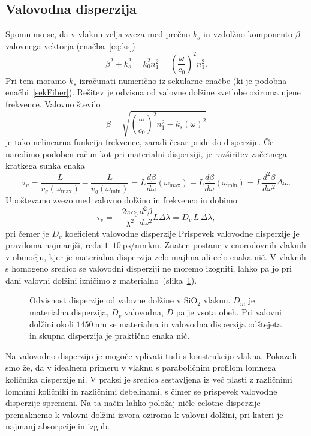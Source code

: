 \subsection*{Valovodna disperzija}
Spomnimo se, da v vlaknu velja zveza med prečno $k_s$ in vzdolžno komponento $\beta$ 
valovnega vektorja (enačba~\ref{eq:ks})
\begin{equation}
\beta^2 + k_s^2 = k_0^2 n_1^2 = \left( \frac{\omega}{c_0}\right)^2n_1^2.
\end{equation}
Pri tem moramo $k_s$ izračunati numerično iz sekularne enačbe (ki je podobna enačbi~\ref{sekFiber}). 
Rešitev je odvisna od valovne dolžine svetlobe oziroma njene frekvence. Valovno število  
\begin{equation}
\beta = \sqrt{\left( \frac{\omega}{c_0}\right)^2n_1^2 - k_s(\omega)^2}
\end{equation}
je tako nelinearna funkcija frekvence, zaradi česar pride do disperzije. Če naredimo podoben 
račun kot pri materialni disperziji, je razširitev začetnega kratkega sunka enaka
\begin{equation}
\tau_v = \frac{L}{v_g(\omega_{\mathrm{max}})} - \frac{L}{v_g(\omega_{\mathrm{min}})} = 
L\frac{d \beta}{d\omega}(\omega_{\mathrm{max}}) - L\frac{d \beta}{d\omega}(\omega_{\mathrm{min}})=
L \frac{d^2\beta}{d\omega^2}\Delta \omega.
\label{ValD}
\end{equation}
Upoštevamo zvezo med valovno dolžino in frekvenco in dobimo 
\begin{equation}
\tau_v=-\frac{2 \pi c_0}{\lambda^2}\frac{d^2\beta}{d\omega^2}L \Delta \lambda= D_v\,L\, \Delta \lambda,
\end{equation}
pri čemer je  $D_v$ koeficient valovodne disperzije
Prispevek valovodne disperzije je praviloma najmanjši, reda 
$1$--$10~\si{\pico\second/\nano\meter\,\kilo\meter}$. 
Znaten postane v enorodovnih vlaknih v območju, kjer je materialna disperzija 
zelo majhna ali celo enaka nič. 
V vlaknih s homogeno sredico se valovodni disperziji ne moremo
izogniti, lahko pa jo pri dani valovni dolžini izničimo z materialno~(slika~\ref{fig:MatVal}). 
\begin{figure}[h]
\centering
\def\svgwidth{90truemm} 
 
\caption{Odvisnost disperzije od valovne dolžine v SiO$_2$ vlaknu. $D_m$ je materialna
disperzija, $D_v$ valovodna, $D$ pa je vsota obeh. Pri valovni dolžini
okoli $1450~\si{\nano\meter}$ se materialna in valovodna disperzija odštejeta in skupna disperzija
je praktično enaka nič.}
\label{fig:MatVal}
\end{figure}
\begin{remark}
Na valovodno disperzijo je mogoče vplivati tudi s konstrukcijo vlakna. Pokazali smo že, da
v idealnem primeru v vlaknu s paraboličnim profilom lomnega količnika disperzije ni. 
V praksi je sredica sestavljena iz več plasti z različnimi lomnimi količniki in različnimi
debelinami, s čimer se prispevek valovodne disperzije spremeni. Na ta način lahko 
položaj ničle celotne disperzije premaknemo k valovni dolžini izvora oziroma k 
valovni dolžini, pri kateri je najmanj absorpcije in izgub.
\end{remark}

